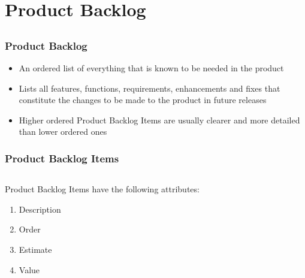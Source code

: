 \section{Product Backlog}
\subsection{}

\begin{frame}
    \frametitle{Product Backlog}
    \begin{itemize}
        \setlength\itemsep{0.7em}
        \item An ordered list of everything that is known to be needed in the product
        \item Lists all features, functions, requirements, enhancements and fixes that constitute the changes to be made to the product in future releases
        \item Higher  ordered Product Backlog Items are usually clearer and more detailed than lower ordered ones
    \end{itemize}
\end{frame}

\begin{frame}
    \frametitle{Product Backlog Items}
    \begin{columns}
        \begin{column}{0.5\textwidth}
            Product Backlog Items have the following attributes:
            \vspace{1em}
            \begin{enumerate}
                \setlength\itemsep{0.7em}
                \item Description
                \item Order
                \item Estimate
                \item Value
            \end{enumerate}
        \end{column}
        \begin{column}{0.5\textwidth}
        \end{column}
    \end{columns}
\end{frame}

